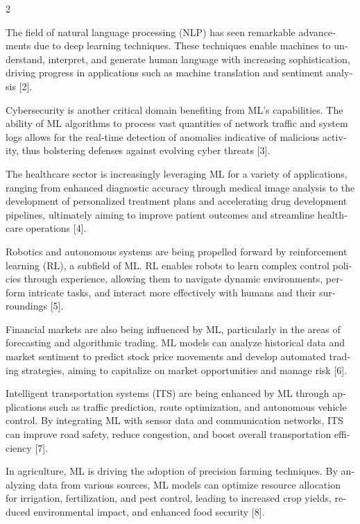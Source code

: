 \documentclass{article}
\begin{document}
\begin{multicols*}{2}
\begin{otherlanguage}{english}
The field of natural language processing (NLP) has seen remarkable advancements due to deep learning techniques. These techniques enable machines to understand, interpret, and generate human language with increasing sophistication, driving progress in applications such as machine translation and sentiment analysis [2].

Cybersecurity is another critical domain benefiting from ML's capabilities. The ability of ML algorithms to process vast quantities of network traffic and system logs allows for the real-time detection of anomalies indicative of malicious activity, thus bolstering defenses against evolving cyber threats [3].

The healthcare sector is increasingly leveraging ML for a variety of applications, ranging from enhanced diagnostic accuracy through medical image analysis to the development of personalized treatment plans and accelerating drug development pipelines, ultimately aiming to improve patient outcomes and streamline healthcare operations [4].

Robotics and autonomous systems are being propelled forward by reinforcement learning (RL), a subfield of ML. RL enables robots to learn complex control policies through experience, allowing them to navigate dynamic environments, perform intricate tasks, and interact more effectively with humans and their surroundings [5].

Financial markets are also being influenced by ML, particularly in the areas of forecasting and algorithmic trading. ML models can analyze historical data and market sentiment to predict stock price movements and develop automated trading strategies, aiming to capitalize on market opportunities and manage risk [6].

Intelligent transportation systems (ITS) are being enhanced by ML through applications such as traffic prediction, route optimization, and autonomous vehicle control. By integrating ML with sensor data and communication networks, ITS can improve road safety, reduce congestion, and boost overall transportation efficiency [7].

In agriculture, ML is driving the adoption of precision farming techniques. By analyzing data from various sources, ML models can optimize resource allocation for irrigation, fertilization, and pest control, leading to increased crop yields, reduced environmental impact, and enhanced food security [8].
\end{otherlanguage}

\vspace{2em}


\end{multicols*}
\end{document}
